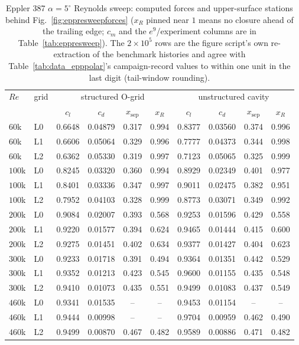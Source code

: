 \begin{table}[tp]
  \centering\small
  \caption{Eppler 387 $\alpha\!=\!5^\circ$ Reynolds sweep: computed forces and upper-surface stations behind Fig.~\ref{fig:eppresweepforces} ($x_R$ pinned near $1$ means no closure ahead of the trailing edge; $c_m$ and the $e^9$/experiment columns are in Table~\ref{tab:eppresweep}). The $2\times10^5$ rows are the figure script's own re-extraction of the benchmark histories and agree with Table~\ref{tab:data_epppolar}'s campaign-record values to within one unit in the last digit (tail-window rounding).}
  \label{tab:data_eppresweep}
  \begin{tabular}{ll cccc cccc}
    \toprule
    $Re$ & grid & \multicolumn{4}{c}{structured O-grid} & \multicolumn{4}{c}{unstructured cavity} \\ & & $c_l$ & $c_d$ & $x_\mathrm{sep}$ & $x_R$ & $c_l$ & $c_d$ & $x_\mathrm{sep}$ & $x_R$ \\
    \midrule
    $60$k & L0 & 0.6648 & 0.04879 & 0.317 & 0.994 & 0.8377 & 0.03560 & 0.374 & 0.996 \\
    $60$k & L1 & 0.6606 & 0.05064 & 0.329 & 0.996 & 0.7777 & 0.04373 & 0.344 & 0.998 \\
    $60$k & L2 & 0.6362 & 0.05330 & 0.319 & 0.997 & 0.7123 & 0.05065 & 0.325 & 0.999 \\
    $100$k & L0 & 0.8245 & 0.03320 & 0.360 & 0.994 & 0.8929 & 0.02349 & 0.401 & 0.977 \\
    $100$k & L1 & 0.8401 & 0.03336 & 0.347 & 0.997 & 0.9011 & 0.02475 & 0.382 & 0.951 \\
    $100$k & L2 & 0.7952 & 0.04103 & 0.328 & 0.999 & 0.8773 & 0.03071 & 0.349 & 0.992 \\
    $200$k & L0 & 0.9084 & 0.02007 & 0.393 & 0.568 & 0.9253 & 0.01596 & 0.429 & 0.558 \\
    $200$k & L1 & 0.9220 & 0.01577 & 0.394 & 0.624 & 0.9465 & 0.01444 & 0.415 & 0.600 \\
    $200$k & L2 & 0.9275 & 0.01451 & 0.402 & 0.634 & 0.9377 & 0.01427 & 0.404 & 0.623 \\
    $300$k & L0 & 0.9233 & 0.01718 & 0.391 & 0.494 & 0.9364 & 0.01351 & 0.442 & 0.529 \\
    $300$k & L1 & 0.9352 & 0.01213 & 0.423 & 0.545 & 0.9600 & 0.01155 & 0.435 & 0.548 \\
    $300$k & L2 & 0.9410 & 0.01073 & 0.435 & 0.551 & 0.9499 & 0.01083 & 0.437 & 0.549 \\
    $460$k & L0 & 0.9341 & 0.01535 & -- & -- & 0.9453 & 0.01154 & -- & -- \\
    $460$k & L1 & 0.9444 & 0.00998 & -- & -- & 0.9704 & 0.00959 & 0.462 & 0.490 \\
    $460$k & L2 & 0.9499 & 0.00870 & 0.467 & 0.482 & 0.9589 & 0.00886 & 0.471 & 0.482 \\
    \bottomrule
  \end{tabular}
\end{table}

